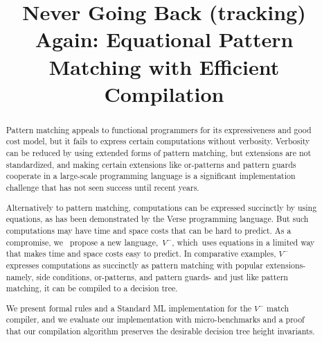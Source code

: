 \documentclass[manuscript,screen 12pt, nonacm]{acmart}
\title{Never Going Back (tracking) Again: Equational Pattern Matching with Efficient Compilation}
\begin{document}
\begin{abstract}
    Pattern matching appeals to functional programmers for its expressiveness
    and good cost model, but it fails to express certain computations without
    verbosity. Verbosity can be reduced by using extended forms of pattern
    matching, but extensions are not standardized, and making certain extensions
    like or-patterns and pattern guards cooperate in a large-scale programming
    language is a significant implementation challenge that has not seen success
    until recent years. 
    
    Alternatively to pattern matching, computations can be expressed succinctly
    by using equations, as has been demonstrated by the Verse programming
    language. But such computations may have time and space costs that can be
    hard to predict. As a compromise, we ~propose a new language,~\ensuremath{V^{-}},
    which~uses equations in a limited way that makes time and space costs easy
    to predict. In comparative examples, \ensuremath{V^{-}}~ expresses computations as
    succinctly as pattern matching with popular extensions- namely, side
    conditions, or-patterns, and pattern guards- and just like pattern matching,
    it can be compiled to a decision tree. 
    
    We present formal rules and a Standard ML implementation for the \ensuremath{V^{-}}
    match compiler, and we evaluate our implementation with micro-benchmarks and
    a proof that our compilation algorithm preserves the desirable decision tree
    height invariants. 

\end{abstract}

\maketitle
\end{document}
